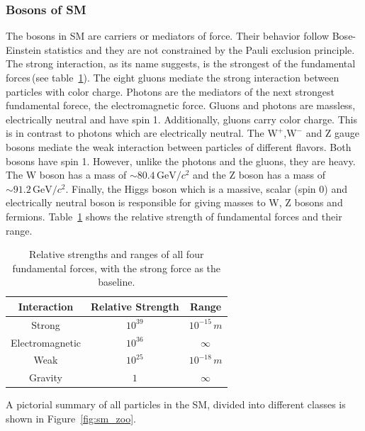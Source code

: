 \subsubsection{Bosons of SM}
The bosons in SM are carriers or mediators of force. Their behavior follow Bose-Einstein statistics and they are not constrained by the Pauli exclusion principle. The strong interaction, as its name suggests, is the strongest of the fundamental forces\,(see table~\ref{tab:forces}). The eight gluons mediate the strong interaction between particles with color charge. Photons are the mediators of the next strongest fundamental forece, the electromagnetic force. Gluons and photons are massless, electrically neutral and have spin 1. Additionally, gluons carry color charge. This is in contrast to photons which are electrically neutral. The $\mathrm{W}^+$,$\mathrm{W}^-$ and Z gauge bosons mediate the weak interaction between particles of different flavors. Both bosons have spin 1. However, unlike the photons and the gluons, they are heavy. The W boson has a mass of $\sim 80.4\,\mathrm{GeV}/c^2$ and the Z boson has a mass of $\sim 91.2\,\mathrm{GeV}/c^2$. Finally, the Higgs boson which is a massive, scalar (spin 0) and electrically neutral boson is responsible for giving masses to W, Z bosons and fermions. Table~\ref{tab:forces} shows the relative strength of fundamental forces and their range.         

\begin{table}[hbtp]
\begin{center}
\caption{Relative strengths and ranges of all four fundamental forces, with the strong force as the baseline.}
\begin{tabular}{c|c|c}
\hline
Interaction & Relative Strength & Range \\
\hline
Strong & $10^{39}$ & $10^{-15}\,m$\\
Electromagnetic & $10^{36}$& $\infty$\\
Weak &  $10^{25}$ &$10^{-18}\,m$\\
Gravity & $1$ &$\infty$\\
\hline
\end{tabular}
\label{tab:forces}
\end{center}
\end{table}

A pictorial summary of all particles in the SM, divided into different classes is shown in Figure~\ref{fig:sm_zoo}.

